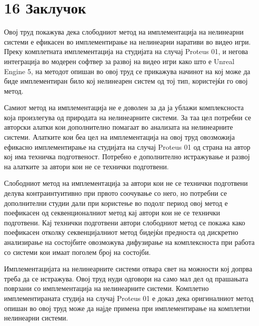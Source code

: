 \section{16 Заклучок}

Овој труд покажува дека слободниот метод на имплементација на нелинеарни системи е ефикасен во имплементирање на нелинеарни наративи во видео игри. Преку комплетната имплементација на студијата на случај Proteus 01, и негова интеграција во модерен софтвер за развој на видео игри како што е Unreal Engine 5, на методот опишан во овој труд се прикажува начинот на кој може да биде имплементиран било кој нелинеарен систем од тој тип, користејќи го овој метод.

Самиот метод на имплементација не е доволен за да ја ублажи комплексноста која произлегува од природата на нелинеарните системи. За таа цел потребни се авторски алатки кои дополнително помагаат во анализата на нелинеарните системи. Алатките кои беа цел на имплементација на овој труд овозможија ефикасно имплементирање на студијата на случај Proteus 01 од страна на автор кој има техничка подготвеност. Потребно е дополнително истражување и развој на алатките за автори кои не се технички подготвени.

Слободниот метод на имплементација за автори кои не се технички подготвени делува контраинтуитивно при првото соочување со него, но потребни се дополнителни студии дали при користење во подолг период овој метод е поефикасен од секвенционалниот метод кај автори кои не се технички подготвени. Кај технички подготвени автори слободниот метод се покажа како поефикасен отколку секвенцијалниот метод бидејќи предноста од дискретно анализирање на состојбите овозможува дифузирање на комплексноста при работа со системи кои имаат поголем број на состојби.

Имплементацијата на нелинеарните системи отвара свет на можности кој допрва треба да се истражува. Овој труд нуди одговори на само мал дел од прашањата поврзани со имплементација на нелинеарните системи. Комплетно имплементираната студија на случај Proteus 01 е доказ дека оригиналниот метод опишан во овој труд може да најде примена при имплементирање на комплетни нелинеарни системи.

